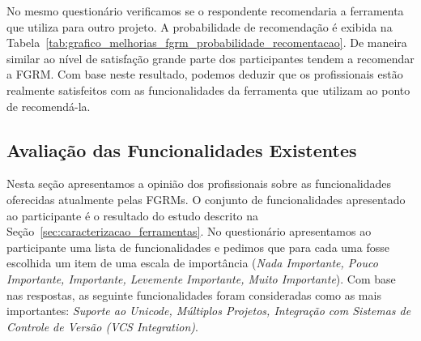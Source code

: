 No mesmo questionário verificamos se o respondente recomendaria a ferramenta
que utiliza para outro projeto. A probabilidade de recomendação é exibida na
Tabela~\ref{tab:grafico_melhorias_fgrm_probabilidade_recomentacao}. De maneira
similar ao nível de satisfação grande parte dos participantes tendem a
recomendar a FGRM\@. Com base neste resultado, podemos deduzir que os
profissionais estão realmente satisfeitos com as funcionalidades da ferramenta
que utilizam ao ponto de recomendá-la.

\begin{table}[htpb]
\centering
{}
\caption{Probabilidade de Recomendação da Ferramenta Utilizada}\label{tab:grafico_melhorias_fgrm_probabilidade_recomentacao}
\end{table}

\subsection{Avaliação das Funcionalidades Existentes}\label{sub:avaliação_das_funcionalidades_existentes}

Nesta seção apresentamos a opinião dos profissionais sobre as funcionalidades
oferecidas atualmente pelas FGRMs\@. O conjunto de funcionalidades apresentado
ao participante é o resultado do estudo descrito na
Seção~\ref{sec:caracterizacao_ferramentas}. No questionário apresentamos ao
participante uma lista de funcionalidades e pedimos que para cada uma fosse
escolhida um item de uma escala de importância (\textit{Nada Importante, Pouco
    Importante, Importante, Levemente Importante, Muito Importante}). Com base
nas respostas, as seguinte funcionalidades foram consideradas como as mais
importantes: \textit{Suporte ao Unicode, Múltiplos Projetos, Integração com
    Sistemas de Controle de Versão (VCS Integration)}.

